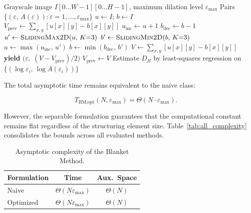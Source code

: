 \begin{algorithm}[t]
\caption{Optimized Blanket Method (Separable Monotonic Deque)}
\label{alg:bm_opt}
\begin{algorithmic}[1]
\Require Grayscale image $I[0\ldots W{-}1][0\ldots H{-}1]$, maximum dilation level $\varepsilon_{\max}$
\Ensure Pairs $\{(\varepsilon,\, A(\varepsilon)) : \varepsilon = 1,\ldots,\varepsilon_{\max}\}$
\State $u \leftarrow I$;\; $b \leftarrow I$
\State $V_{\text{prev}} \leftarrow \sum_{x,y} [u[x][y] - b[x][y]]$
  \State $u_{\text{inc}} \leftarrow u + 1$ \hfill{}
  \State $b_{\text{dec}} \leftarrow b - 1$
  \State $u' \leftarrow \textsc{SlidingMax2D}(u,\, K{=}3)$ \hfill{}
  \State $b' \leftarrow \textsc{SlidingMin2D}(b,\, K{=}3)$ \hfill{}
  \State $u \leftarrow \max(u_{\text{inc}},\, u')$ \hfill{}
  \State $b \leftarrow \min(b_{\text{dec}},\, b')$
  \State $V \leftarrow \sum_{x,y} [u[x][y] - b[x][y]]$
  \State \textbf{yield} $\bigl(\varepsilon,\; (V - V_{\text{prev}})/2\bigr)$
  \State $V_{\text{prev}} \leftarrow V$
\EndFor
\State Estimate $D_B$ by least-squares regression on $\{(\log \varepsilon_i,\, \log A(\varepsilon_i))\}$
\end{algorithmic}
\end{algorithm}

The total asymptotic time remains equivalent to the naive class:

\begin{equation}
  T_{\text{BM,opt}}(N, \varepsilon_{\max}) = \Theta(N \cdot \varepsilon_{\max}).
  \label{eq:bm_opt_total}
\end{equation}

However, the separable formulation guarantees that the computational constant remains flat regardless of the structuring element size. Table~\ref{tab:all_complexity} consolidates the bounds across all evaluated methods.

\begin{table}[h]
\centering
\caption{Asymptotic complexity of the Blanket Method.}
\label{tab:bm_complexity}
\begin{tabular}{lcc}
\hline
\textbf{Formulation} & \textbf{Time} & \textbf{Aux.\ Space} \\
\hline
Naive     & $\Theta(N\varepsilon_{\max})$ & $\Theta(N)$ \\
Optimized & $\Theta(N\varepsilon_{\max})$ & $\Theta(N)$ \\
\hline
\end{tabular}
\end{table}

